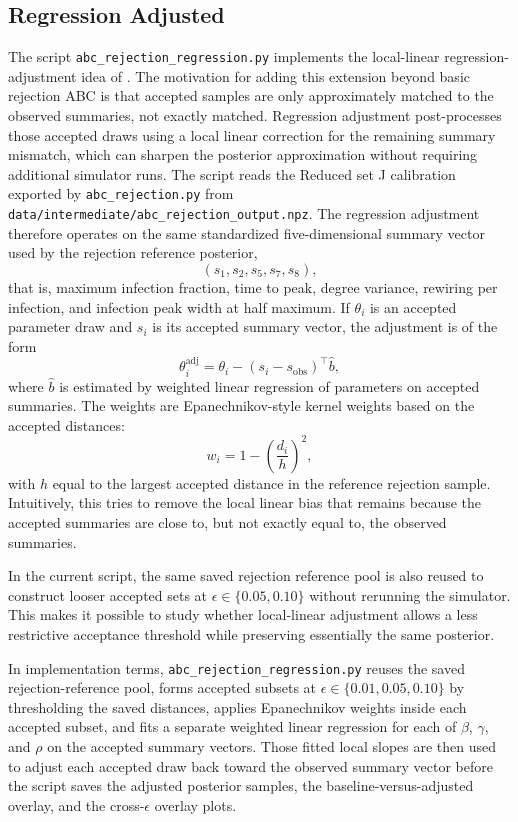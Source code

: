 \documentclass[11pt]{article}
\begin{document}
\subsection{Regression Adjusted}

The script \texttt{abc\_rejection\_regression.py} implements the local-linear regression-adjustment idea of \citet{beaumont2002}. The motivation for adding this extension beyond basic rejection ABC is that accepted samples are only approximately matched to the observed summaries, not exactly matched. Regression adjustment post-processes those accepted draws using a local linear correction for the remaining summary mismatch, which can sharpen the posterior approximation without requiring additional simulator runs. The script reads the Reduced set J calibration exported by \texttt{abc\_rejection.py} from \texttt{data/intermediate/abc\_rejection\_output.npz}. The regression adjustment therefore operates on the same standardized five-dimensional summary vector used by the rejection reference posterior,
\[
(s_1,s_2,s_5,s_7,s_8),
\]
that is, maximum infection fraction, time to peak, degree variance, rewiring per infection, and infection peak width at half maximum. If $\theta_i$ is an accepted parameter draw and $s_i$ is its accepted summary vector, the adjustment is of the form
\[
\theta_i^{\text{adj}} = \theta_i - (s_i - s_{\text{obs}})^\top \widehat{b},
\]
where $\widehat{b}$ is estimated by weighted linear regression of parameters on accepted summaries. The weights are Epanechnikov-style kernel weights based on the accepted distances:
\[
w_i = 1 - \left(\frac{d_i}{h}\right)^2,
\]
with $h$ equal to the largest accepted distance in the reference rejection sample. Intuitively, this tries to remove the local linear bias that remains because the accepted summaries are close to, but not exactly equal to, the observed summaries.

In the current script, the same saved rejection reference pool is also reused to construct looser accepted sets at $\epsilon \in \{0.05,0.10\}$ without rerunning the simulator. This makes it possible to study whether local-linear adjustment allows a less restrictive acceptance threshold while preserving essentially the same posterior.

In implementation terms, \texttt{abc\_rejection\_regression.py} reuses the saved rejection-reference pool, forms accepted subsets at $\epsilon \in \{0.01,0.05,0.10\}$ by thresholding the saved distances, applies Epanechnikov weights inside each accepted subset, and fits a separate weighted linear regression for each of $\beta$, $\gamma$, and $\rho$ on the accepted summary vectors. Those fitted local slopes are then used to adjust each accepted draw back toward the observed summary vector before the script saves the adjusted posterior samples, the baseline-versus-adjusted overlay, and the cross-$\epsilon$ overlay plots.
\end{document}
